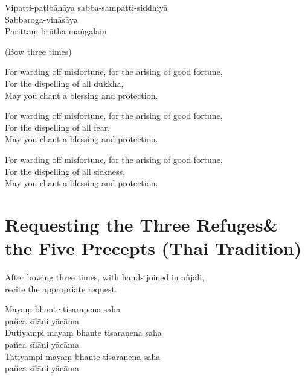 Vipatti-paṭibāhāya sabba-sampatti-siddhiyā\\
Sabbaroga-vināsāya\\
Parittaṃ brūtha maṅgalaṃ

\begin{instruction}
  (Bow three times)
\end{instruction}

\ifhandbookedition
\enlargethispage{\baselineskip}
\fi

\begin{english}
For warding off misfortune, for the arising of good fortune,\\
For the dispelling of all dukkha,\\
May you chant a blessing and protection.

For warding off misfortune, for the arising of good fortune,\\
For the dispelling of all fear,\\
May you chant a blessing and protection.

For warding off misfortune, for the arising of good fortune,\\
For the dispelling of all sickness,\\
May you chant a blessing and protection.
\end{english}

\clearpage

\section[Three Refuges \& the Five Precepts]{Requesting the Three Refuges\newline \& the Five Precepts (Thai Tradition)}

\label{three-refuges}

\begin{instruction}
  After bowing three times, with hands joined in añjali,\\
  recite the appropriate request.
\end{instruction}

\ifhandbookedition
\enlargethispage{\baselineskip}
\fi


Mayaṃ bhante tisaraṇena saha\\\vin pañca sīlāni yācāma\\
Dutiyampi mayaṃ bhante tisaraṇena saha\\\vin pañca sīlāni yācāma\\
Tatiyampi mayaṃ bhante tisaraṇena saha\\\vin pañca sīlāni yācāma

